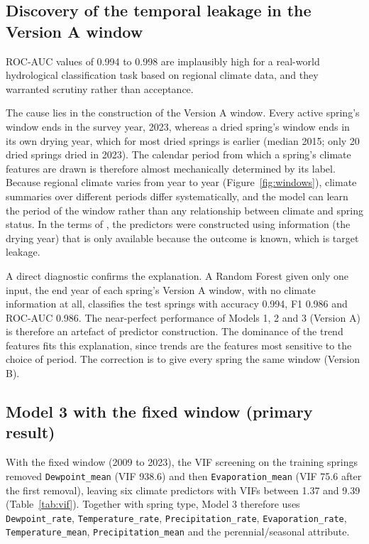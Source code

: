 \documentclass[12pt,a4paper]{article}
\begin{document}
\subsection{Discovery of the temporal leakage in the Version A window}\label{sec:leakage}

ROC-AUC values of 0.994 to 0.998 are implausibly high for a real-world hydrological classification task based on regional climate data, and they warranted scrutiny rather than acceptance.

The cause lies in the construction of the Version A window. Every active spring's window ends in the survey year, 2023, whereas a dried spring's window ends in its own drying year, which for most dried springs is earlier (median 2015; only 20 dried springs dried in 2023). The calendar period from which a spring's climate features are drawn is therefore almost mechanically determined by its label. Because regional climate varies from year to year (Figure~\ref{fig:windows}), climate summaries over different periods differ systematically, and the model can learn the period of the window rather than any relationship between climate and spring status. In the terms of \citet{kaufman2011}, the predictors were constructed using information (the drying year) that is only available because the outcome is known, which is target leakage.

A direct diagnostic confirms the explanation. A Random Forest given only one input, the end year of each spring's Version A window, with no climate information at all, classifies the test springs with accuracy 0.994, F1 0.986 and ROC-AUC 0.986. The near-perfect performance of Models 1, 2 and 3 (Version A) is therefore an artefact of predictor construction. The dominance of the trend features fits this explanation, since trends are the features most sensitive to the choice of period. The correction is to give every spring the same window (Version B).

\subsection{Model 3 with the fixed window (primary result)}\label{sec:m3}

With the fixed window (2009 to 2023), the VIF screening on the training springs removed \texttt{Dewpoint\_\allowbreak{}mean} (VIF 938.6) and then \texttt{Evaporation\_\allowbreak{}mean} (VIF 75.6 after the first removal), leaving six climate predictors with VIFs between 1.37 and 9.39 (Table~\ref{tab:vif}). Together with spring type, Model 3 therefore uses \texttt{Dewpoint\_\allowbreak{}rate}, \texttt{Temperature\_\allowbreak{}rate}, \texttt{Precipitation\_\allowbreak{}rate}, \texttt{Evaporation\_\allowbreak{}rate}, \texttt{Temperature\_\allowbreak{}mean}, \texttt{Precipitation\_\allowbreak{}mean} and the perennial/seasonal attribute.
\end{document}
